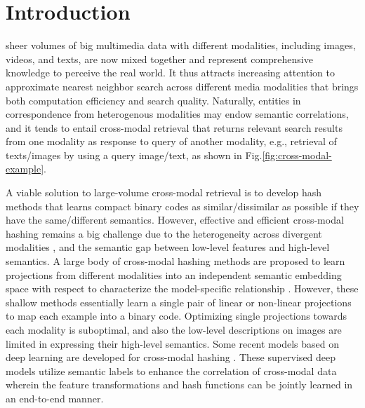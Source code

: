 \documentclass[10pt,journal,twocolumn]{IEEEtran}
\begin{document}
\IEEEdisplaynontitleabstractindextext

\IEEEpeerreviewmaketitle

\section{Introduction}\label{sec:intro}


 sheer volumes of big multimedia data with different modalities, including images, videos, and texts, are now mixed together and represent comprehensive knowledge to perceive the real world. It thus attracts increasing attention to approximate nearest neighbor search across different media modalities that brings both computation efficiency and search quality. Naturally, entities in correspondence from heterogenous modalities may endow semantic correlations, and it tends to entail cross-modal retrieval that returns relevant search results from one modality as response to query of another modality, e.g., retrieval of texts/images by using a query image/text, as shown in Fig.\ref{fig:cross-modal-example}.


A viable solution to large-volume cross-modal retrieval is to develop hash methods that learns compact binary codes as similar/dissimilar as possible if they have the same/different semantics. However, effective and efficient cross-modal hashing remains a big challenge due to the heterogeneity across divergent modalities \cite{Semantics-hash}, and the semantic gap between low-level features and high-level semantics. A large body of cross-modal hashing methods are proposed to learn projections from different modalities into an independent semantic embedding space with respect to characterize the model-specific relationship \cite{LBMCH,Shao-TPAMI,Wu-cyber18,Yang-TNNLS17,Yang-TIP17,Wu-PR182,Yang-TIP15,YangCIKM2013,LinMM2013,Wu-PR18,YangMM2015}. However, these shallow methods essentially learn a single pair of linear or non-linear projections to map each example into a binary code. Optimizing single projections towards each modality is suboptimal, and also the low-level descriptions on images are limited in expressing their high-level semantics. Some recent models based on deep learning are developed for cross-modal hashing \cite{DVSH,CMDVH,Multimodal-hashing,Corr-AE,CAH,DCMH}. These supervised deep models utilize semantic labels to enhance the correlation of cross-modal data wherein the feature transformations and hash functions can be jointly learned in an end-to-end manner.
\end{document}
